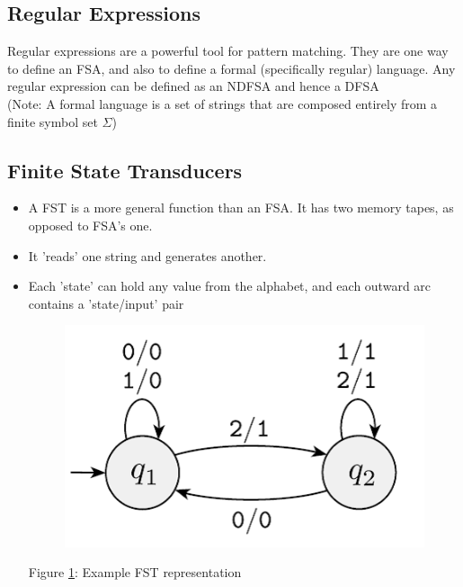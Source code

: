\documentclass[]{article}
\begin{document}
\subsection{Regular Expressions}


Regular expressions are a powerful tool for pattern matching. 
They are one way to define an FSA, and also to define a formal (specifically regular) language. Any regular expression can be defined as an NDFSA and hence a DFSA \\


(Note: A formal language is a set of strings that are composed entirely from a finite symbol set $\Sigma$)

\subsection{Finite State Transducers}

\begin{itemize}
	\item A FST is a more general function than an FSA. It has two memory tapes, as opposed to FSA's one. 
	
	\item It 'reads' one string and generates another.
	
	\item Each 'state' can hold any value from the alphabet, and each outward arc contains a 'state/input' pair
	
	\begin{figure}[h!]
		\begin{center}
			\includegraphics[width=0.5\linewidth]{./images/fst1.png}
			\label{fig:fst1}
		\end{center}
	\end{figure}
	
	\begin{center}
		Figure \ref{fig:fst1}: Example FST representation
	\end{center}
\end{itemize}








\end{document}
